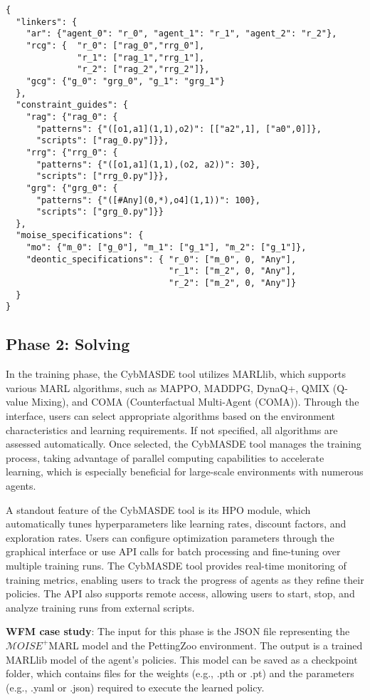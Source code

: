 \documentclass[sigconf,anonymous]{aamas}
\begin{document}
{
\footnotesize
\begin{verbatim}
{ 
  "linkers": {
    "ar": {"agent_0": "r_0", "agent_1": "r_1", "agent_2": "r_2"},
    "rcg": {  "r_0": ["rag_0","rrg_0"],
              "r_1": ["rag_1","rrg_1"],
              "r_2": ["rag_2","rrg_2"]},
    "gcg": {"g_0": "grg_0", "g_1": "grg_1"}
  },
  "constraint_guides": {
    "rag": {"rag_0": {
      "patterns": {"([o1,a1](1,1),o2)": [["a2",1], ["a0",0]]},
      "scripts": ["rag_0.py"]}},
    "rrg": {"rrg_0": {
      "patterns": {"([o1,a1](1,1),(o2, a2))": 30},
      "scripts": ["rrg_0.py"]}},
    "grg": {"grg_0": {
      "patterns": {"([#Any](0,*),o4](1,1))": 100},
      "scripts": ["grg_0.py"]}}
  },
  "moise_specifications": {
    "mo": {"m_0": ["g_0"], "m_1": ["g_1"], "m_2": ["g_1"]},
    "deontic_specifications": { "r_0": ["m_0", 0, "Any"],
                                "r_1": ["m_2", 0, "Any"],
                                "r_2": ["m_2", 0, "Any"]}
  }
}
\end{verbatim}
}

\subsection{Phase 2: Solving}

In the training phase, the CybMASDE tool utilizes MARLlib, which supports various MARL algorithms, such as MAPPO, MADDPG, DynaQ+, QMIX (Q-value Mixing), and COMA (Counterfactual Multi-Agent (COMA)). Through the interface, users can select appropriate algorithms based on the environment characteristics and learning requirements. If not specified, all algorithms are assessed automatically. Once selected, the CybMASDE tool manages the training process, taking advantage of parallel computing capabilities to accelerate learning, which is especially beneficial for large-scale environments with numerous agents.

A standout feature of the CybMASDE tool is its HPO module, which automatically tunes hyperparameters like learning rates, discount factors, and exploration rates. Users can configure optimization parameters through the graphical interface or use API calls for batch processing and fine-tuning over multiple training runs. The CybMASDE tool provides real-time monitoring of training metrics, enabling users to track the progress of agents as they refine their policies. The API also supports remote access, allowing users to start, stop, and analyze training runs from external scripts.

\textbf{WFM case study}: The input for this phase is the JSON file representing the $\mathcal{M}OISE^+$MARL model and the PettingZoo environment. The output is a trained MARLlib model of the agent's policies. This model can be saved as a checkpoint folder, which contains files for the weights (e.g., .pth or .pt) and the parameters (e.g., .yaml or .json) required to execute the learned policy.
\end{document}

